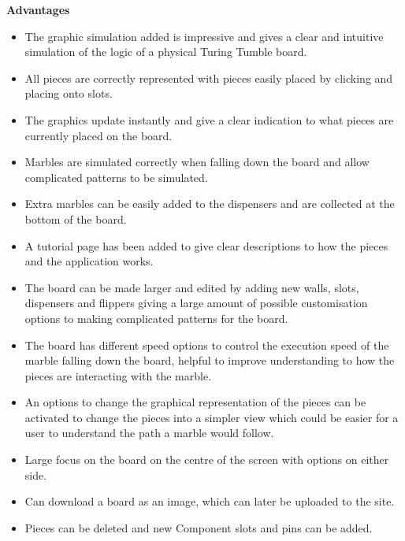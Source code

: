 \documentclass{l4proj}
\begin{document}
\textbf{Advantages}
\begin{itemize}
    \item The graphic simulation added is impressive and gives a clear and intuitive simulation of the logic of a physical Turing Tumble board.
    \item All pieces are correctly represented with pieces easily placed by clicking and placing onto slots.
    \item The graphics update instantly and give a clear indication to what pieces are currently placed on the board.
    \item Marbles are simulated correctly when falling down the board and allow complicated patterns to be simulated.
    \item Extra marbles can be easily added to the dispensers and are collected at the bottom of the board.
    \item A tutorial page has been added to give clear descriptions to how the pieces and the application works. 
    \item The board can be made larger and edited by adding new walls, slots, dispensers and flippers giving a large amount of possible customisation options to making complicated patterns for the board.
    \item The board has different speed options to control the execution speed of the marble falling down the board, helpful to improve understanding to how the pieces are interacting with the marble.
    \item An options to change the graphical representation of the pieces can be activated to change the pieces into a simpler view which could be easier for a user to understand the path a marble would follow.
    \item Large focus on the board on the centre of the screen with options on either side.
    \item Can download a board as an image, which can later be uploaded to the site.
    \item Pieces can be deleted and new Component slots and pins can be added.
\end{itemize}
\end{document}
